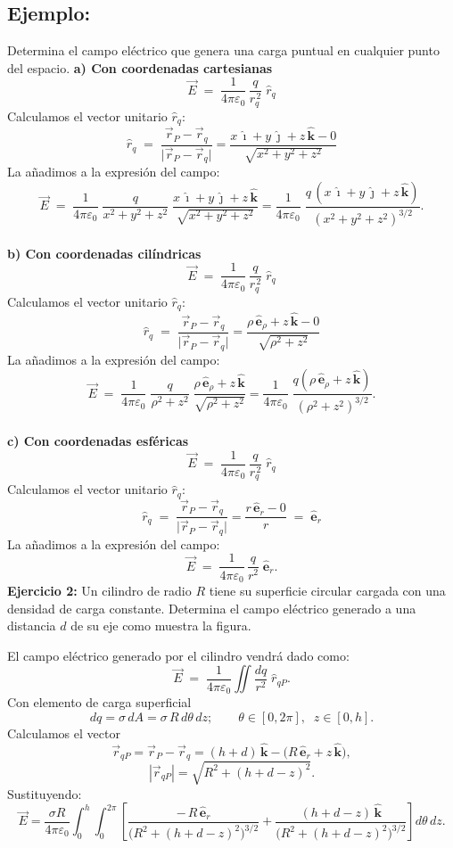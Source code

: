 \documentclass[a4paper,12pt]{article}
\begin{document}
\subsection*{Ejemplo:}
\noindent 
Determina el campo eléctrico que genera una carga puntual en cualquier punto del espacio.
\noindent
\textbf{a) Con coordenadas cartesianas}
\[
\vec E \;=\; \frac{1}{4\pi\varepsilon_0}\,\frac{q}{r_q^{\,2}}\;\hat r_q
\]
Calculamos el vector unitario $\hat r_q$:
\[
\hat r_q \;=\; \frac{\vec r_P-\vec r_q}{\lvert \vec r_P-\vec r_q\rvert}
= \frac{x\,\hat{\imath}+y\,\hat{\jmath}+z\,\hat{\mathbf k}-0}{\sqrt{x^{2}+y^{2}+z^{2}}}
\]
La añadimos a la expresión del campo:
\[
\vec E \;=\; \frac{1}{4\pi\varepsilon_0}\;
\frac{q}{x^{2}+y^{2}+z^{2}}\;
\frac{x\,\hat{\imath}+y\,\hat{\jmath}+z\,\hat{\mathbf k}}{\sqrt{x^{2}+y^{2}+z^{2}}}
= \frac{1}{4\pi\varepsilon_0}\;
\frac{q\,(x\,\hat{\imath}+y\,\hat{\jmath}+z\,\hat{\mathbf k})}{(x^{2}+y^{2}+z^{2})^{3/2}}.
\]\\
\noindent
\textbf{b) Con coordenadas cilíndricas}
\[
\vec E \;=\; \frac{1}{4\pi\varepsilon_0}\,\frac{q}{r_q^{\,2}}\;\hat r_q
\]
Calculamos el vector unitario $\hat r_q$:
\[
\hat r_q \;=\; \frac{\vec r_P-\vec r_q}{\lvert \vec r_P-\vec r_q\rvert}
= \frac{\rho\,\hat{\mathbf e}_\rho + z\,\hat{\mathbf k}-0}{\sqrt{\rho^{2}+z^{2}}}
\]
La añadimos a la expresión del campo:
\[
\vec E \;=\; \frac{1}{4\pi\varepsilon_0}\;
\frac{q}{\rho^{2}+z^{2}}\;
\frac{\rho\,\hat{\mathbf e}_\rho + z\,\hat{\mathbf k}}{\sqrt{\rho^{2}+z^{2}}}
= \frac{1}{4\pi\varepsilon_0}\;
\frac{q\left(\rho\,\hat{\mathbf e}_\rho + z\,\hat{\mathbf k}\right)}{(\rho^{2}+z^{2})^{3/2}}.
\]\\
\noindent
\textbf{c) Con coordenadas esféricas}
\[
\vec E \;=\; \frac{1}{4\pi\varepsilon_0}\,\frac{q}{r_q^{\,2}}\;\hat r_q
\]
Calculamos el vector unitario $\hat r_q$:
\[
\hat r_q \;=\; \frac{\vec r_P-\vec r_q}{\lvert \vec r_P-\vec r_q\rvert}
= \frac{r\,\hat{\mathbf e}_r - 0}{r} \;=\; \hat{\mathbf e}_r
\]
La añadimos a la expresión del campo:
\[
\vec E \;=\; \frac{1}{4\pi\varepsilon_0}\,\frac{q}{r^{2}}\;\hat{\mathbf e}_r .
\]
\newpage
\noindent
\textbf{Ejercicio 2:} Un cilindro de radio \(R\) tiene su superficie circular cargada con una densidad de carga constante.
Determina el campo eléctrico generado a una distancia \(d\) de su eje como muestra la figura.

\medskip
\noindent
El campo eléctrico generado por el cilindro vendrá dado como:
\[
\vec E \;=\; \frac{1}{4\pi\varepsilon_0}\iint \frac{dq}{r^{2}}\;\hat r_{qP}.
\]
Con elemento de carga superficial
\[
dq=\sigma\,dA=\sigma\,R\,d\theta\,dz;
\qquad
\theta\in[0,2\pi],\;\; z\in[0,h].
\]
Calculamos el vector
\[
\vec r_{qP}=\vec r_P-\vec r_q
= (h+d)\,\hat{\mathbf k} - \big(R\,\hat{\mathbf e}_r + z\,\hat{\mathbf k}\big),
\]
\[
|\vec r_{qP}|=\sqrt{R^{2}+(h+d-z)^{2}}.
\]
Sustituyendo:
\[
\vec E
=\frac{\sigma R}{4\pi\varepsilon_0}
\int_{0}^{h}\!\!\int_{0}^{2\pi}
\left[
\frac{-\,R\,\hat{\mathbf e}_r}{\big(R^{2}+(h+d-z)^{2}\big)^{3/2}}
+\frac{(h+d-z)\,\hat{\mathbf k}}{\big(R^{2}+(h+d-z)^{2}\big)^{3/2}}
\right] d\theta\,dz .
\]
\end{document}
